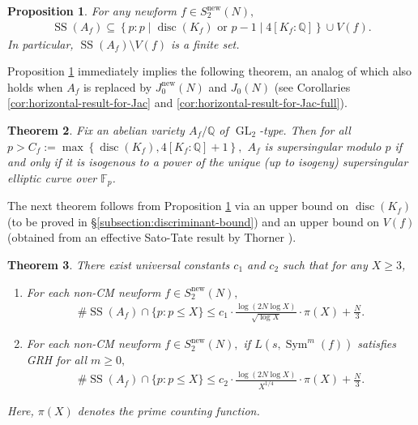 \documentclass[11pt,letterpaper,reqno]{amsart}
\newtheorem{theorem}{Theorem}[section]
\newtheorem{proposition}[theorem]{Proposition}
\theoremstyle{definition}
\numberwithin{equation}{section}
\numberwithin{figure}{section}
\numberwithin{table}{section}
\newcommand{\nw}{\mathrm{new}}
\begin{document}
\begin{proposition}\label{prop:structure-result}
    For any newform $f \in S_2^{\nw}(N),$
    \begin{align}
        \operatorname{SS}(A_f) \subseteq \left\{ p : p \mid \operatorname{disc}(K_f) \text{ or } p - 1 \mid 4[K_f : \mathbb{Q} ] \right\} \cup V(f).
    \end{align}
    In particular, $\operatorname{SS}(A_f) \setminus V(f)$ is a finite set.
\end{proposition}

Proposition \ref{prop:structure-result} immediately implies the following theorem, an analog of which also holds when $A_f$ is replaced by $J_0^\nw(N)$ and $J_0(N)$ (see Corollaries \ref{cor:horizontal-result-for-Jac} and \ref{cor:horizontal-result-for-Jac-full}).

\begin{theorem}\label{main-horizontal}
    Fix an abelian variety $A_f/\mathbb{Q}$ of $\operatorname{GL}_2$-type. Then for all \\ $p > C_f := \max \left\{ \operatorname{disc}(K_f), 4[K_f : \mathbb{Q}] + 1\right\},$ $A_f$ is supersingular modulo $p$ if and only if it is isogenous to a power of the unique (up to isogeny) supersingular elliptic curve over $\mathbb{F}_p$.
\end{theorem}

The next theorem follows from Proposition \ref{prop:structure-result} via an upper bound on $\operatorname{disc}(K_f)$ (to be proved in \S\ref{subsection:discriminant-bound}) and an upper bound on $V(f)$ (obtained from an effective Sato-Tate result by Thorner \cite{Thorner2021Effective}).

\begin{theorem}\label{thm:Hui-improvement}
    There exist universal constants $c_1$ and $c_2$ such that for any $X \geq 3$,
    \begin{enumerate}
        \item For each non-CM newform $f \in S_2^\nw(N),$
    \begin{align}
        \#  \operatorname{SS}(A_f) \cap \{p : p \leq X\} \leq c_1 \cdot \frac{\log (2N \log X)}{\sqrt{\log X}} \cdot \pi(X) + \frac{N}{3}.
    \end{align}
    \item For each non-CM newform $f \in S_2^\nw(N),$ if $L(s, \operatorname{Sym}^m (f))$ satisfies GRH for all $m \geq 0,$
    \begin{align}
        \#  \operatorname{SS}(A_f) \cap \{p : p \leq X\} \leq c_2 \cdot \frac{\log (2N \log X)}{X^{1/4}} \cdot \pi(X) + \frac{N}{3}.
    \end{align}
    \end{enumerate}
    Here, $\pi(X)$ denotes the prime counting function.
\end{theorem}
\end{document}
